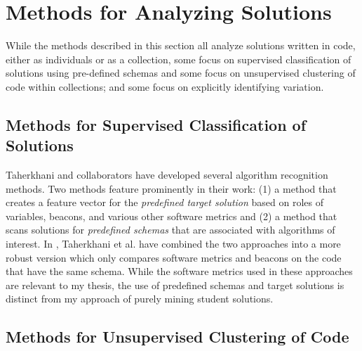 \begin{comment}
Grokker is a document-clustering visualization system, with small popup windows to read texts in parallel \cite{slaney}. Unlike DocMatrix, Grokker's primary representation of a corpus of documents is as clusters of dots, but the study design and results are still relevant here. The task for Grokker readers was to quickly browse a large document collection, and then answer a set of questions to test their understanding. A key finding of this study was that small details of document viewability and the amount of time it took the participants to access content dramatically affected how much they understood about the domain.  In other words, small changes in the amount of time to switch between related documents was an important variable.  
\end{comment}

\section{Methods for Analyzing Solutions}

While the methods described in this section all analyze solutions written in code, either as individuals or as a collection, some focus on supervised classification of solutions using pre-defined schemas and some focus on unsupervised clustering of code within collections; and some focus on explicitly identifying variation.

\subsection{Methods for Supervised Classification of Solutions}

Taherkhani and collaborators have developed several algorithm recognition methods. Two methods feature prominently in their work: (1) a method that creates a feature vector for the \emph{predefined target solution} based on roles of variables, beacons, and various other software metrics and (2) a method that scans solutions for \emph{predefined schemas} that are associated with algorithms of interest. In \cite{taherkhani13}, Taherkhani et al. have combined the two approaches into a more robust version which only compares software metrics and beacons on the code that have the same schema. While the software metrics used in these approaches are relevant to my thesis, the use of predefined schemas and target solutions is distinct from my approach of purely mining student solutions.

\subsection{Methods for Unsupervised Clustering of Code}


